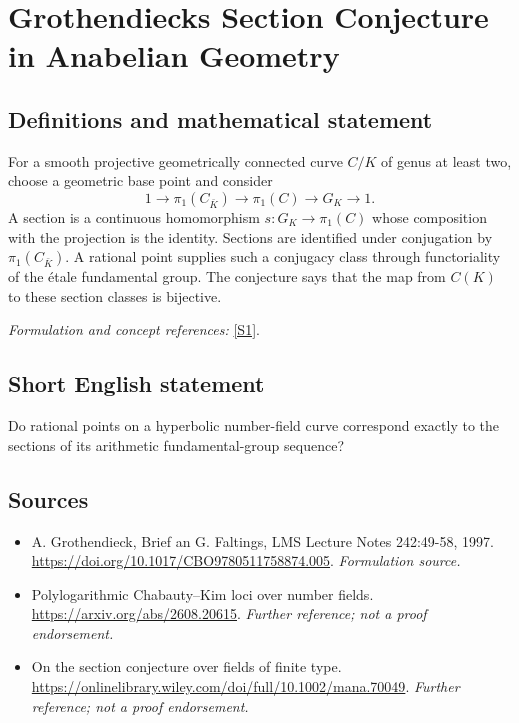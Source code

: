 \documentclass[11pt]{article}
\begin{document}
\section*{\texorpdfstring{Grothendiecks Section Conjecture in Anabelian Geometry}{Grothendiecks Section Conjecture in Anabelian Geometry}}\label{statement}
\subsection{Definitions and mathematical statement}
For a smooth projective geometrically connected curve $C/K$ of genus at least two, choose a geometric base point and consider
\[
 1\longrightarrow\pi_1(C_{\bar K})\longrightarrow\pi_1(C)
 \longrightarrow G_K\longrightarrow1.
\]
A section is a continuous homomorphism $s:G_K\to\pi_1(C)$ whose composition with the projection is the identity. Sections are identified under conjugation by $\pi_1(C_{\bar K})$. A rational point supplies such a conjugacy class through functoriality of the étale fundamental group. The conjecture says that the map from $C(K)$ to these section classes is bijective.
\par\smallskip\textit{Formulation and concept references:} \href{https://doi.org/10.1017/CBO9780511758874.005}{[S1]}.

\subsection{Short English statement}
Do rational points on a hyperbolic number-field curve correspond exactly to the sections of its arithmetic fundamental-group sequence?
\subsection{Sources}
\begin{itemize}
\item[S1]A. Grothendieck, Brief an G. Faltings, LMS Lecture Notes 242:49-58, 1997.
\url{https://doi.org/10.1017/CBO9780511758874.005}.
\textit{Formulation source.}
\item[S2]Polylogarithmic Chabauty--Kim loci over number fields.
\url{https://arxiv.org/abs/2608.20615}.
\textit{Further reference; not a proof endorsement.}
\item[S3]On the section conjecture over fields of finite type.
\url{https://onlinelibrary.wiley.com/doi/full/10.1002/mana.70049}.
\textit{Further reference; not a proof endorsement.}
\end{itemize}
\end{document}
